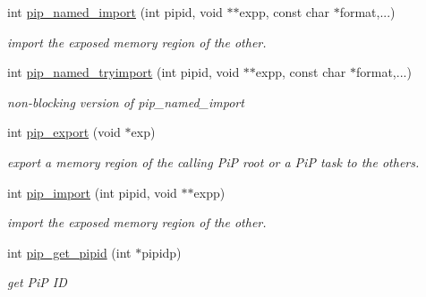 \begin{DoxyCompactItemize}
\item 
int \hyperlink{group__libpip_ga37fed4773558ccab6911785c872bc057}{pip\-\_\-named\-\_\-import} (int pipid, void $\ast$$\ast$expp, const char $\ast$format,...)
\begin{DoxyCompactList}\small\item\em import the exposed memory region of the other. \end{DoxyCompactList}\end{DoxyCompactItemize}
\begin{DoxyCompactItemize}
\item 
int \hyperlink{group__libpip_gaa4b5ad0f8227ba1010648718dae04730}{pip\-\_\-named\-\_\-tryimport} (int pipid, void $\ast$$\ast$expp, const char $\ast$format,...)
\begin{DoxyCompactList}\small\item\em non-\/blocking version of {\ttfamily pip\-\_\-named\-\_\-import} \end{DoxyCompactList}\end{DoxyCompactItemize}
\begin{DoxyCompactItemize}
\item 
int \hyperlink{group__libpip_ga76ef9337bec7dd836168f22247d4c64c}{pip\-\_\-export} (void $\ast$exp)
\begin{DoxyCompactList}\small\item\em export a memory region of the calling Pi\-P root or a Pi\-P task to the others. \end{DoxyCompactList}\end{DoxyCompactItemize}
\begin{DoxyCompactItemize}
\item 
int \hyperlink{group__libpip_ga6d7ac596a9da824e40d7c06528f42e5f}{pip\-\_\-import} (int pipid, void $\ast$$\ast$expp)
\begin{DoxyCompactList}\small\item\em import the exposed memory region of the other. \end{DoxyCompactList}\end{DoxyCompactItemize}
\begin{DoxyCompactItemize}
\item 
int \hyperlink{group__libpip_ga4e715bb8c325e9acc81af0745908dc0e}{pip\-\_\-get\-\_\-pipid} (int $\ast$pipidp)
\begin{DoxyCompactList}\small\item\em get Pi\-P I\-D \end{DoxyCompactList}\end{DoxyCompactItemize}
